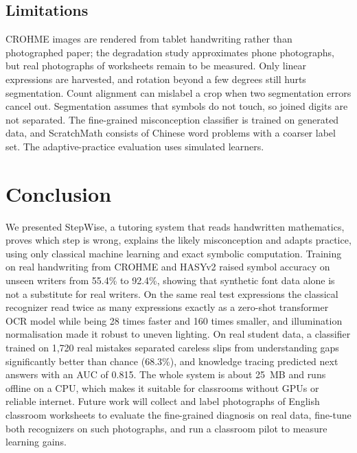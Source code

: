 \documentclass[runningheads]{llncs}
\begin{document}
\subsection{Limitations}

CROHME images are rendered from tablet handwriting rather than photographed paper; the degradation study approximates phone photographs, but real photographs of worksheets remain to be measured. Only linear expressions are harvested, and rotation beyond a few degrees still hurts segmentation. Count alignment can mislabel a crop when two segmentation errors cancel out. Segmentation assumes that symbols do not touch, so joined digits are not separated. The fine-grained misconception classifier is trained on generated data, and ScratchMath consists of Chinese word problems with a coarser label set. The adaptive-practice evaluation uses simulated learners.

\section{Conclusion}

We presented StepWise, a tutoring system that reads handwritten mathematics, proves which step is wrong, explains the likely misconception and adapts practice, using only classical machine learning and exact symbolic computation. Training on real handwriting from CROHME and HASYv2 raised symbol accuracy on unseen writers from 55.4\% to 92.4\%, showing that synthetic font data alone is not a substitute for real writers. On the same real test expressions the classical recognizer read twice as many expressions exactly as a zero-shot transformer OCR model while being 28 times faster and 160 times smaller, and illumination normalisation made it robust to uneven lighting. On real student data, a classifier trained on 1,720 real mistakes separated careless slips from understanding gaps significantly better than chance (68.3\%), and knowledge tracing predicted next answers with an AUC of 0.815. The whole system is about 25~MB and runs offline on a CPU, which makes it suitable for classrooms without GPUs or reliable internet. Future work will collect and label photographs of English classroom worksheets to evaluate the fine-grained diagnosis on real data, fine-tune both recognizers on such photographs, and run a classroom pilot to measure learning gains.
\end{document}
